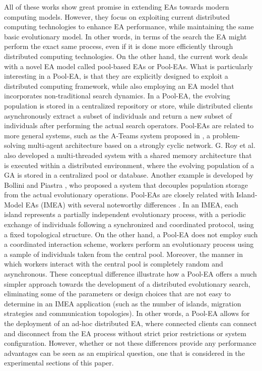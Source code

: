 All of these works show great promise in extending EAs towards modern computing models.
However, they focus on exploiting current distributed computing technologies to enhance EA performance, while maintaining the same basic evolutionary model.
In other words, in terms of the search the EA might perform the exact same process, even if it is done more efficiently through distributed computing technologies.
On the other hand, the current work deals with a novel EA model called pool-based EAs or Pool-EAs.
What is particularly interesting in a Pool-EA, is that they are explicitly designed to exploit a distributed computing framework, while also employing
an EA model that incorporates non-traditional search dynamics.
In a Pool-EA, the evolving population is stored in a centralized repository or store, while distributed clients asynchronously extract a subset
of individuals and return a new subset of individuals after performing the actual search operators.
Pool-EAs are related to more general systems, such as the A-Teams system proposed in \cite{ateam}, a problem-solving multi-agent architecture based on a strongly cyclic network.
G. Roy et al. \cite{roy:2009} also developed a multi-threaded system with a shared memory architecture
that is executed within a distributed environment, where the evolving population of a GA is stored in a centralized pool or database.
Another example is developed by Bollini and Piastra \cite{bollini:1999}, who proposed a system that decouples population storage from the actual evolutionary operations.
Pool-EAs are closely related with Island-Model EAs (IMEA) \cite{cantu} with several noteworthy differences \cite{PoolvsIsland}.
In an IMEA, each island represents a partially independent evolutionary process, with a periodic exchange of
individuals following a synchronized and coordinated protocol, using a fixed topological structure.
On the other hand, a Pool-EA does not employ such a coordinated interaction scheme, workers perform an evolutionary process
using a sample of individuals taken from the central pool.
Moreover, the manner in which workers interact with the central pool is completely random and asynchronous.
These conceptual difference illustrate how a Pool-EA offers a much simpler approach towards the development of a distributed evolutionary
search, eliminating some of the parameters or design choices that are not easy to determine in an IMEA application
(such as the number of islands, migration strategies and communication topologies).
In other words, a Pool-EA allows for the deployment of an ad-hoc distributed EA, where connected clients can connect and disconnect from the
EA process without strict prior restrictions or system configuration.
However, whether or not these differences provide any performance advantages can be seen as an empirical question, one that is considered
in the experimental sections of this paper.


